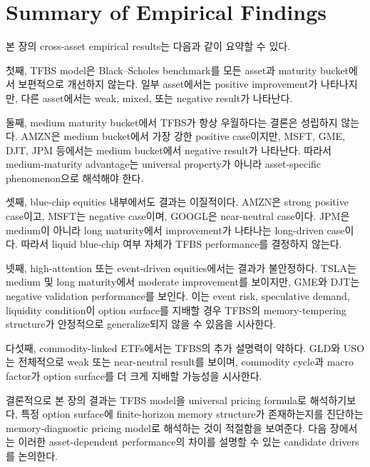 \documentclass[11pt,a4paper]{report}
\begin{document}
\section{Summary of Empirical Findings}

본 장의 cross-asset empirical results는 다음과 같이 요약할 수 있다.

첫째, TFBS model은 Black--Scholes benchmark를 모든 asset과 maturity bucket에서 보편적으로 개선하지 않는다. 일부 asset에서는 positive improvement가 나타나지만, 다른 asset에서는 weak, mixed, 또는 negative result가 나타난다.

둘째, medium maturity bucket에서 TFBS가 항상 우월하다는 결론은 성립하지 않는다. AMZN은 medium bucket에서 가장 강한 positive case이지만, MSFT, GME, DJT, JPM 등에서는 medium bucket에서 negative result가 나타난다. 따라서 medium-maturity advantage는 universal property가 아니라 asset-specific phenomenon으로 해석해야 한다.

셋째, blue-chip equities 내부에서도 결과는 이질적이다. AMZN은 strong positive case이고, MSFT는 negative case이며, GOOGL은 near-neutral case이다. JPM은 medium이 아니라 long maturity에서 improvement가 나타나는 long-driven case이다. 따라서 liquid blue-chip 여부 자체가 TFBS performance를 결정하지 않는다.

넷째, high-attention 또는 event-driven equities에서는 결과가 불안정하다. TSLA는 medium 및 long maturity에서 moderate improvement를 보이지만, GME와 DJT는 negative validation performance를 보인다. 이는 event risk, speculative demand, liquidity condition이 option surface를 지배할 경우 TFBS의 memory-tempering structure가 안정적으로 generalize되지 않을 수 있음을 시사한다.

다섯째, commodity-linked ETFs에서는 TFBS의 추가 설명력이 약하다. GLD와 USO는 전체적으로 weak 또는 near-neutral result를 보이며, commodity cycle과 macro factor가 option surface를 더 크게 지배할 가능성을 시사한다.

결론적으로 본 장의 결과는 TFBS model을 universal pricing formula로 해석하기보다, 특정 option surface에 finite-horizon memory structure가 존재하는지를 진단하는 memory-diagnostic pricing model로 해석하는 것이 적절함을 보여준다. 다음 장에서는 이러한 asset-dependent performance의 차이를 설명할 수 있는 candidate drivers를 논의한다.
\end{document}
